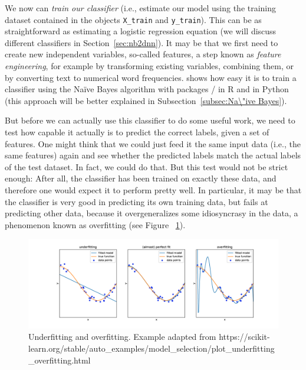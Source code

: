 
We now can \emph{train our classifier} (i.e., estimate our model using the
training dataset contained in the objects \texttt{X\_train} and \texttt{y\_train}). This can be as straightforward as estimating a
logistic regression equation (we will discuss different classifiers in
Section~\ref{sec:nb2dnn}).  It may be that we first need to create new
independent variables, so-called features, a step known as
\emph{feature engineering}, for example by transforming existing
variables, combining them, or by converting text to numerical word
frequencies.
 shows how easy it is to train a classifier using the Na\"ive Bayes algorithm with packages / in R and  in Python (this approach will be better explained in Subsection~\ref{subsec:Na\"ive Bayes}).


But before we can actually use this classifier to do some useful work, we need to test how capable it actually is to predict the
correct labels, given a set of features. One might think that we could
just feed it the same input data (i.e., the same features) again and
see whether the predicted labels match the actual labels of the test
dataset.  In fact, we could do that.  But this test would not be
strict enough: After all, the classifier has been trained on exactly
these data, and therefore one would expect it to perform pretty well.
In particular, it may be that the classifier is very good in
predicting its own training data, but fails at predicting other data,
because it overgeneralizes some idiosyncrasy in the data, a phenomenon
known as overfitting (see Figure ~\ref{fig:overfit}).

\begin{figure} 
\centering
\includegraphics[width=\linewidth]{figures/ch09_overfitting}
\caption{Underfitting and overfitting. Example adapted from https://scikit-learn.org/stable/auto\_examples/model\_selection/plot\_underfitting\_overfitting.html}
\label{fig:overfit}
\end{figure}


